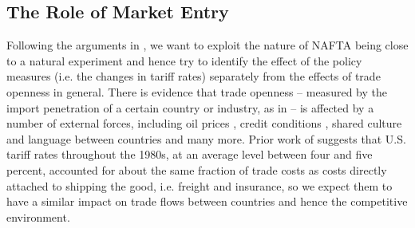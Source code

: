 
\subsection{The Role of Market Entry}
Following the arguments in \citet{Trefler2004}, we want to exploit the nature of NAFTA being close to a natural experiment and hence try to identify the effect of the policy measures (i.e. the changes in tariff rates) separately from the effects of trade openness in general. There is evidence that trade openness -- measured by the import penetration of a certain country or industry, as in \citet{Chen2009} -- is affected by a number of external forces, including oil prices \citep{Kilian2009}, credit conditions \citep{Chor2012}, shared culture and language between countries and many more. Prior work of \citet{Bernard2006} suggests that U.S. tariff rates throughout the 1980s, at an average level between four and five percent, accounted for about the same fraction of trade costs as costs directly attached to shipping the good, i.e. freight and insurance, so we expect them to have a similar impact on trade flows between countries and hence the competitive environment. \vspace{0.5cm} \\

